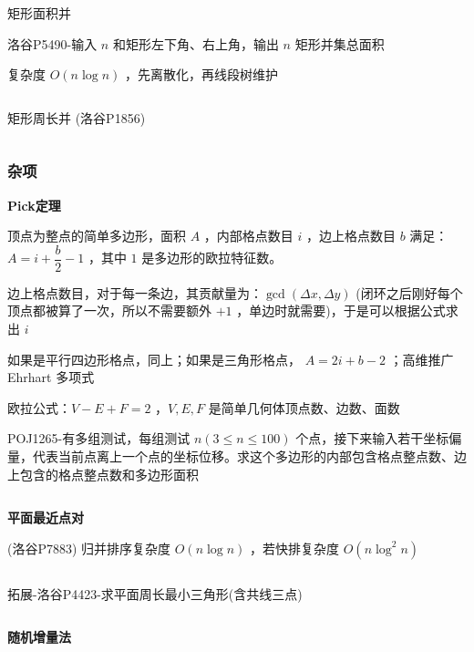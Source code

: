 \documentclass[twocolumn,10pt]{ctexart}
\makeatletter
\newcommand{\hfive}[1]{\par\addvspace{6pt}\@afterindentfalse
  {\noindent\bfseries\normalsize #1}\par\nobreak\vspace{2pt}}
\makeatother
\begin{document}
矩形面积并

\begin{notebox}
洛谷P5490-输入 $n$ 和矩形左下角、右上角，输出 $n$ 矩形并集总面积
\end{notebox}

复杂度 $O(n\log n)$ ，先离散化，再线段树维护

\inputminted{cpp}{code/p5490_scanning_line.cpp}

矩形周长并 (洛谷P1856)

\inputminted{cpp}{code/p1856_scanning_line.cpp}

\subsubsection{杂项}

\hfive{Pick定理}

顶点为整点的简单多边形，面积 $A$ ，内部格点数目 $i$ ，边上格点数目 $b$ 满足：$A=i+\dfrac b2-1$ ，其中 $1$ 是多边形的欧拉特征数。

边上格点数目，对于每一条边，其贡献量为：$\gcd(\Delta x,\Delta y)$ (闭环之后刚好每个顶点都被算了一次，所以不需要额外 $+1$ ，单边时就需要)，于是可以根据公式求出 $i$

\begin{notebox}
如果是平行四边形格点，同上；如果是三角形格点， $A=2i+b-2$ ；高维推广 Ehrhart 多项式
\end{notebox}

欧拉公式：$V-E+F=2$ ，$V,E,F$ 是简单几何体顶点数、边数、面数

\begin{notebox}
POJ1265-有多组测试，每组测试 $n(3\le n\le100)$ 个点，接下来输入若干坐标偏量，代表当前点离上一个点的坐标位移。求这个多边形的内部包含格点整点数、边上包含的格点整点数和多边形面积
\end{notebox}

\inputminted{cpp}{code/poj1265_pick_theorem.cpp}

\hfive{平面最近点对}

(洛谷P7883) 归并排序复杂度 $O(n\log n)$ ，若快排复杂度 $O(n\log^2n)$

\inputminted{cpp}{code/p7883_closest_point_pair.cpp}

\begin{notebox}
拓展-洛谷P4423-求平面周长最小三角形(含共线三点)
\end{notebox}

\inputminted{cpp}{code/p4423_min_triangle.cpp}

\hfive{随机增量法}
\end{document}
